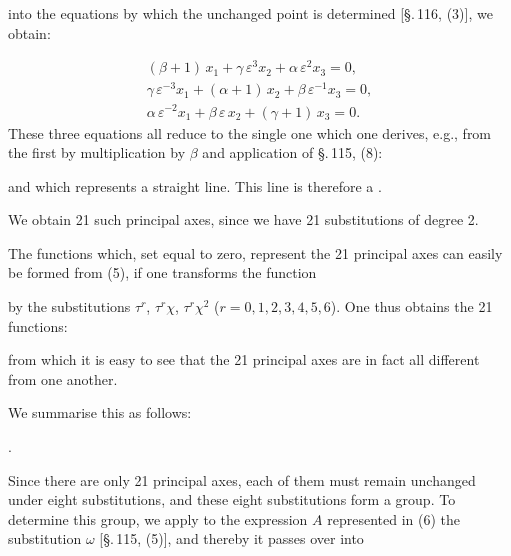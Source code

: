 into the equations by which the unchanged point is determined [\S.\,116, (3)], we obtain:

\[
\begin{array}{l}
(\beta+1)\,x_1 + \gamma\,\varepsilon^3 x_2 + \alpha\,\varepsilon^2 x_3 = 0,\\
\gamma\,\varepsilon^{-3} x_1 + (\alpha+1)\,x_2 + \beta\,\varepsilon^{-1} x_3 = 0,\\
\alpha\,\varepsilon^{-2} x_1 + \beta\,\varepsilon\, x_2 + (\gamma+1)\,x_3 = 0.
\end{array}
\]
These three equations all reduce to the single one which one derives, e.g., from the first by multiplication by $\beta$ and application of \S.\,115, (8):

and which represents a straight line. This line is therefore a .

We obtain 21 such principal axes, since we have 21 substitutions of degree 2.

The functions which, set equal to zero, represent the 21 principal axes can easily be formed from (5), if one transforms the function

by the substitutions $\tau^r$, $\tau^r\chi$, $\tau^r\chi^2$ ($r = 0, 1, 2, 3, 4, 5, 6$). One thus obtains the 21 functions:

from which it is easy to see that the 21 principal axes are in fact all different from one another.

We summarise this as follows:

.\ 

Since there are only 21 principal axes, each of them must remain unchanged under eight substitutions, and these eight substitutions form a group. To determine this group, we apply to the expression $A$ represented in (6) the substitution $\omega$ [\S.\,115, (5)], and thereby it passes over into

